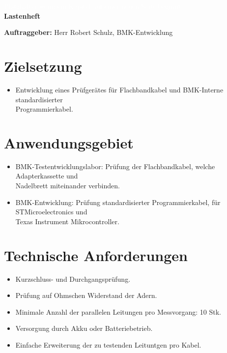 \documentclass[a4paper,11pt]{scrartcl}
\begin{document}
\begin{center}
	\begin{huge}
	\textcolor{white}{\tiny{Platzhalter wenn ein Kapitel auf einer neuen Seite beginnt\\}}
	\textbf{Lastenheft}
	\end{huge}
\end{center}

\textbf{Auftraggeber:}
Herr Robert Schulz, BMK-Entwicklung


\section{Zielsetzung}

\begin{itemize}
	\item{Entwicklung eines Prüfgerätes für Flachbandkabel und BMK-Interne standardisierter \\ Programmierkabel.}
\end{itemize}

\section{Anwendungsgebiet}

\begin{itemize}
	\item{BMK-Testentwicklungslabor: Prüfung der Flachbandkabel, welche Adapterkassette und \\ Nadelbrett miteinander verbinden.}
	
	\item{BMK-Entwicklung: Prüfung standardisierter Programmierkabel, für STMicroelectronics und \\ Texas Instrument Mikrocontroller.}
\end{itemize}

\section{Technische Anforderungen}

\begin{itemize}
	\item{Kurzschluss- und Durchgangsprüfung.}
	\item{Prüfung auf Ohmschen Widerstand der Adern.}
	\item{Minimale Anzahl der parallelen Leitungen pro Messvorgang: 10 Stk.}
	\item{Versorgung durch Akku oder Batteriebetrieb.}
	\item{Einfache Erweiterung der zu testenden Leituntgen pro Kabel.}
\end{itemize}
\end{document}
